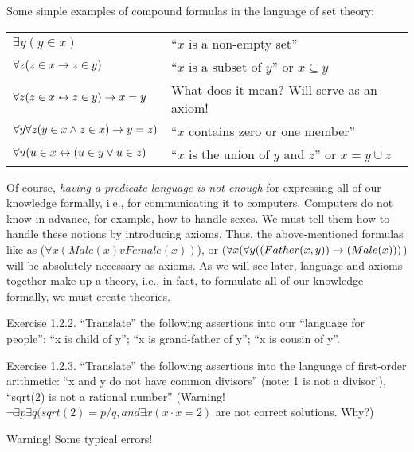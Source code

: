 \begin{example}
Some simple examples of compound formulas in the language of set theory:
\begin{center}
\begin{tabular}{l l}
\(\exists y(y \in x)\)
& ``\(x\) is a non-empty set'' \\
\(\forall z (z \in x\rightarrow z \in y)\)
& ``\(x\) is a subset of \(y\)'' or \(x\subseteq y\) \\
\(\forall z (z\in x\leftrightarrow z\in y)\rightarrow x=y\)
& What does it mean? Will serve as an axiom! \\
\(\forall y\forall z(y\in x \wedge z\in x)\rightarrow y=z)\)
& ``\(x\) contains zero or one member'' \\
\(\forall u (u\in x\leftrightarrow (u\in y \vee u\in z)\)
& ``\(x\) is the union of \(y\) and \(z\)'' or \(x=y\cup z\)
\end{tabular}
\end{center}
\end{example}

Of course, \emph{having a predicate language is not enough} for expressing all of our knowledge formally, i.e., for communicating it to computers.
Computers do not know in advance, for example, how to handle sexes.
We must tell them how to handle these notions by introducing axioms. Thus, the above-mentioned formulas like as (\(\forall x(Male(x) v Female(x))\)), or (\(\forall x(\forall y((Father(x, y))\rightarrow (Male(x)))\)) will be absolutely necessary as axioms.
As we will see later, language and axioms together make up a theory, i.e., in fact, to formulate all of our knowledge formally, we must create theories.
\begin{exercise}
Exercise 1.2.2. ``Translate'' the following assertions into our ``language for people'':
``x is child of y'';
``x is grand-father of y'';
``x is cousin of y''.
\end{exercise}

\begin{exercise}
Exercise 1.2.3. ``Translate'' the following assertions into the language of first-order arithmetic:
``x and y do not have common divisors'' (note: 1 is not a divisor!),
``sqrt(2) is not a rational number''
(Warning! \(\neg \exists p\exists q(sqrt(2)=p/q, and \exists x(x\cdot x=2)\) are not correct solutions. Why?)
\end{exercise}

Warning! Some typical errors!

